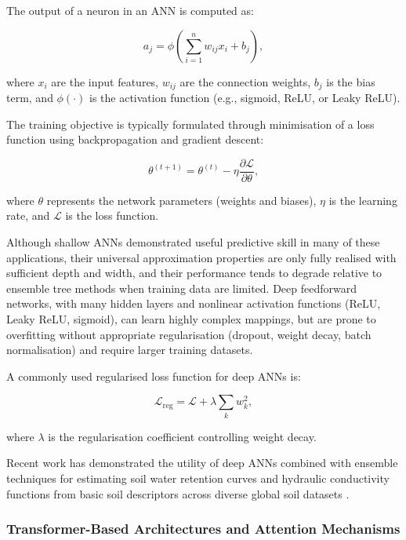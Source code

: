 \documentclass[land,article,submit,pdftex,moreauthors]{Definitions/mdpi}
\numberwithin{equation}{section}
\begin{document}
The output of a neuron in an ANN is computed as:

\begin{equation}
a_j = \phi \left( \sum_{i=1}^{n} w_{ij} x_i + b_j \right),
\end{equation}

where $x_i$ are the input features, $w_{ij}$ are the connection weights, $b_j$ is the bias term, and $\phi(\cdot)$ is the activation function (e.g., sigmoid, ReLU, or Leaky ReLU).

The training objective is typically formulated through minimisation of a loss function using backpropagation and gradient descent:

\begin{equation}
\theta^{(t+1)} =
\theta^{(t)}
-
\eta
\frac{\partial \mathcal{L}}{\partial \theta},
\end{equation}

where $\theta$ represents the network parameters (weights and biases), $\eta$ is the learning rate, and $\mathcal{L}$ is the loss function.

Although shallow ANNs demonstrated useful predictive skill in many of these applications, their universal approximation properties are only fully realised with sufficient depth and width, and their performance tends to degrade relative to ensemble tree methods when training data are limited. Deep feedforward networks, with many hidden layers and nonlinear activation functions (ReLU, Leaky ReLU, sigmoid), can learn highly complex mappings, but are prone to overfitting without appropriate regularisation (dropout, weight decay, batch normalisation) and require larger training datasets.

A commonly used regularised loss function for deep ANNs is:

\begin{equation}
\mathcal{L}_{\text{reg}}
=
\mathcal{L}
+
\lambda
\sum_{k} w_k^2,
\end{equation}

where $\lambda$ is the regularisation coefficient controlling weight decay.

Recent work has demonstrated the utility of deep ANNs combined with ensemble techniques for estimating soil water retention curves and hydraulic conductivity functions from basic soil descriptors across diverse global soil datasets \citep{Lemenkova202403, Lemenkova202410}.

\subsubsection{Transformer-Based Architectures and Attention Mechanisms}
\end{document}
